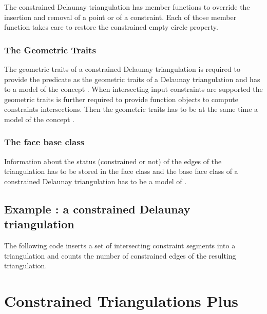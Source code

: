 The constrained Delaunay triangulation
has member functions to override the 
insertion and removal of a point or of a constraint.
Each of those member function takes care
to  restore
 the constrained empty circle
property.

\subsubsection{The Geometric Traits}
 The geometric traits 
of a constrained Delaunay triangulation is required
to provide the  predicate as the geometric traits
of a Delaunay triangulation and has to a model of the concept
. When intersecting input
constraints
are supported the geometric traits is further required 
to provide function objects to compute constraints intersections.
Then the geometric traits has to be at the same time a model
of the concept .



\subsubsection{The face base class}
Information about the status (constrained or not)
of the edges of the triangulation has to be stored
in the face class
 and the base face class
of a constrained Delaunay triangulation has to be a model
of .




\subsection{Example : a  constrained Delaunay triangulation\label{Subsection_2D_Triangulations_Constrained_Delaunay_Example}}
The following code inserts a set of intersecting constraint segments
into a triangulation 
and counts the number of constrained edges of the
resulting triangulation.



\section{Constrained Triangulations Plus\label{Section_2D_Triangulations_Constrained_Plus}}

